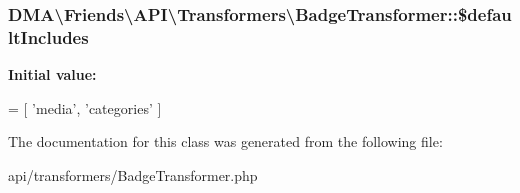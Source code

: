 \subsubsection[{\$default\+Includes}]{\setlength{\rightskip}{0pt plus 5cm}D\+M\+A\textbackslash{}\+Friends\textbackslash{}\+A\+P\+I\textbackslash{}\+Transformers\textbackslash{}\+Badge\+Transformer\+::\$default\+Includes\hspace{0.3cm}{\ttfamily [protected]}}\label{classDMA_1_1Friends_1_1API_1_1Transformers_1_1BadgeTransformer_a82e69be5fd5e311fb322efa0a9a5958c}
{\bfseries Initial value\+:}
\begin{DoxyCode}
= [
             \textcolor{stringliteral}{'media'},
             \textcolor{stringliteral}{'categories'}
     ]
\end{DoxyCode}


The documentation for this class was generated from the following file\+:\begin{DoxyCompactItemize}
\item 
api/transformers/Badge\+Transformer.\+php\end{DoxyCompactItemize}
